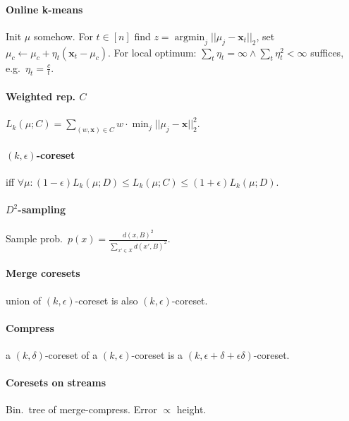 \documentclass[9pt]{scrartcl}
\DeclareMathOperator{\argmin}{argmin}
\newcommand{\eps}{\epsilon}
\begin{document}
\begin{twocolumn}
\paragraph{Online k-means} Init $\mu$ somehow.
For $t \in [n]$ find $z = \argmin_j||\mu_j-\bm x_t||_2$, set $\mu_c \leftarrow \mu_c + \eta_t(\bm x_t - \mu_c)$. For local optimum: $\sum_t \eta_t = \infty \wedge \sum_t \eta_t^2 < \infty$ suffices, e.g.\ $\eta_t = \frac{c}{t}$.

\paragraph{Weighted rep. $C$} $L_k(\mu;C) = \sum_{(w,\bm x)\in C}w\cdot\min_j||\mu_j - \bm x||_2^2$.

\paragraph{$(k,\eps)$-coreset} iff $\forall\mu: (1-\eps)L_k(\mu;D) \leq L_k(\mu;C) \leq (1+\eps)L_k(\mu;D)$.

\paragraph{$D^2$-sampling}
Sample prob.\ $p(x) = \frac{d(x,B)^2}{\sum_{x' \in X} d(x', B)^2}$.


\paragraph{Merge coresets} union of $(k,\eps)$-coreset is also $(k,\eps)$-coreset.

\paragraph{Compress} a $(k,\delta)$-coreset of a $(k,\eps)$-coreset is a $(k,\eps+\delta+\eps\delta)$-coreset.

\paragraph{Coresets on streams} Bin.\ tree of merge-compress. Error $\propto$ height.


\end{twocolumn}
\end{document}
